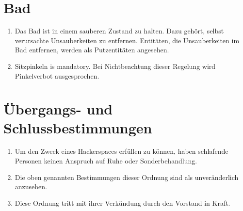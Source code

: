 \documentclass[12pt,a4paper]{scrartcl}
\begin{document}
\section{Bad}
\begin{enumerate}
  \item Das Bad ist in einem sauberen Zustand zu halten. Dazu gehört, selbst
    verursachte Unsauberkeiten zu entfernen. Entitäten, die Unsauberkeiten im
    Bad entfernen, werden als Putzentitäten angesehen.

  \item Sitzpinkeln is mandatory. Bei Nichtbeachtung dieser Regelung wird
    Pinkelverbot ausgesprochen.
\end{enumerate}

\section{Übergangs- und Schlussbestimmungen}
\begin{enumerate}
  \item Um den Zweck eines Hackerspaces erfüllen zu können, haben schlafende
    Personen keinen Anspruch auf Ruhe oder Sonderbehandlung.

  \item Die oben genannten Bestimmungen dieser Ordnung sind als unveränderlich
    anzusehen.

  \item Diese Ordnung tritt mit ihrer Verkündung durch den Vorstand in Kraft.
\end{enumerate}
\end{document}
